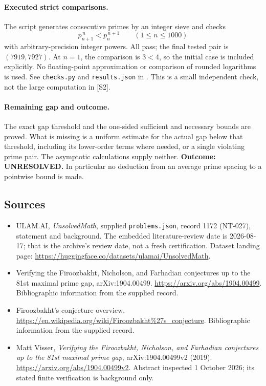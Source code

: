 \documentclass[11pt,a4paper]{article}
\begin{document}
\paragraph{Executed strict comparisons.}
The script generates consecutive primes by an integer sieve and checks
\[
 p_{n+1}^{\,n}<p_n^{\,n+1}\qquad(1\le n\le1000)
\]
with arbitrary-precision integer powers. All pass; the final tested
pair is $(7919,7927)$. At $n=1$, the comparison is $3<4$, so the
initial case is included explicitly. No floating-point approximation
or comparison of rounded logarithms is used. See
\texttt{checks.py} and \texttt{results.json} in
.
This is a small independent check, not the large computation in [S2].

\paragraph{Remaining gap and outcome.}
The exact gap threshold and the one-sided sufficient and necessary
bounds are proved. What is missing is a uniform estimate for the actual
gap below that threshold, including its lower-order terms where needed,
or a single violating prime pair. The asymptotic calculations supply
neither. \textbf{Outcome: UNRESOLVED.} In particular no deduction from
an average prime spacing to a pointwise bound is made.

\subsection{Sources}

{\small

\begin{itemize}

\item[\hypertarget{source:1172:1}{S1}] ULAM.AI, \emph{UnsolvedMath}, supplied \texttt{problems.json}, record 1172 (NT-027), statement and background. The embedded literature-review date is 2026-08-17; that is the archive’s review date, not a fresh certification. Dataset landing page: \url{https://huggingface.co/datasets/ulamai/UnsolvedMath}.

\item[\hypertarget{source:1172:2}{S2}] Verifying the Firoozbakht, Nicholson, and Farhadian conjectures up to the 81st maximal prime gap, arXiv:1904.00499. \url{https://arxiv.org/abs/1904.00499}. Bibliographic information from the supplied record.

\item[\hypertarget{source:1172:3}{S3}] Firoozbakht's conjecture overview. \url{https://en.wikipedia.org/wiki/Firoozbakht%27s_conjecture}. Bibliographic information from the supplied record.


\item[E1] Matt Visser, \emph{Verifying the Firoozbakht,
Nicholson, and Farhadian conjectures up to the 81st maximal prime gap},
arXiv:1904.00499v2 (2019).
\url{https://arxiv.org/abs/1904.00499v2}. Abstract inspected
1 October 2026; its stated finite verification is background only.

\end{itemize}

}

\label{end:1172}
\end{document}
